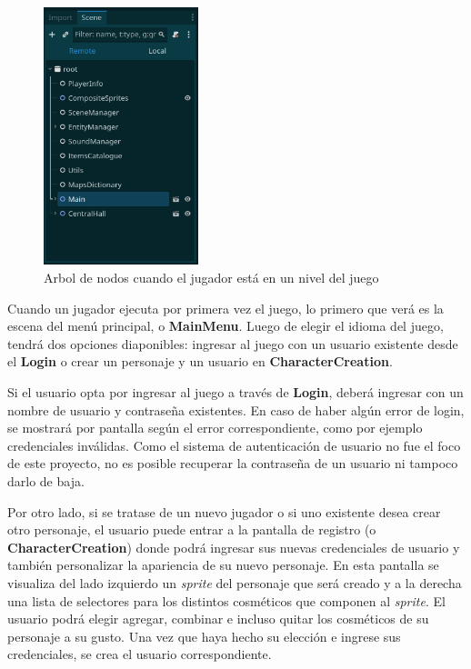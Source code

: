 \begin{figure}[htbp]
    \centering
    \includegraphics[width=0.4\textwidth]{../assets/godot-scene-tree-2.png}
    \caption{Arbol de nodos cuando el jugador está en un nivel del juego}
    \label{fig:node-tree-level}
\end{figure}

Cuando un jugador ejecuta por primera vez el juego, lo primero que verá es la escena del menú principal, 
o \textbf{MainMenu}. Luego de elegir el idioma del juego, tendrá dos opciones diaponibles: ingresar al juego
con un usuario existente desde el \textbf{Login} o crear un personaje y un usuario en \textbf{CharacterCreation}.


Si el usuario opta por ingresar al juego a través de \textbf{Login}, deberá ingresar con un nombre de usuario
y contraseña existentes. En caso de haber algún error de login, se mostrará por pantalla según el error 
correspondiente, como por ejemplo credenciales inválidas. Como el sistema de autenticación de usuario no
fue el foco de este proyecto, no es posible recuperar la contraseña de un usuario ni tampoco darlo de baja.


Por otro lado, si se tratase de un nuevo jugador o si uno existente desea crear otro personaje, el usuario
puede entrar a la pantalla de registro (o \textbf{CharacterCreation}) donde podrá ingresar sus nuevas
credenciales de usuario y también personalizar la apariencia de su nuevo personaje. En esta pantalla
se visualiza del lado izquierdo un \textit{sprite} del personaje que será creado y a la derecha una
lista de selectores para los distintos cosméticos que componen al \textit{sprite}. El usuario podrá elegir
agregar, combinar e incluso quitar los cosméticos de su personaje a su gusto. Una vez que haya hecho su elección
e ingrese sus credenciales, se crea el usuario correspondiente.

